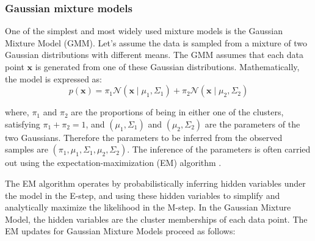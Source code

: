 \subsubsection{Gaussian mixture models}

One of the simplest and most widely used mixture models is the Gaussian Mixture Model (GMM). Let's assume the data is sampled from a mixture of two Gaussian distributions with different means. The GMM assumes that each data point $\mathbf{x}$ is generated from one of these Gaussian distributions. Mathematically, the model is expressed as:
\begin{equation}
p(\mathbf{x}) = \pi_1 \mathcal{N}(\mathbf{x} \mid \mu_1, \Sigma_1) + \pi_2 \mathcal{N}(\mathbf{x} \mid \mu_2, \Sigma_2)
\end{equation}

where, $\pi_1$ and $\pi_2$ are the proportions of being in either one of the clusters, satisfying $\pi_1 + \pi_2 = 1$, and $(\mu_1, \Sigma_1)$ and $(\mu_2, \Sigma_2)$ are the parameters of the two Gaussians. Therefore the parameters to be inferred from the observed samples are $(\pi_1, \mu_1, \Sigma_1, \mu_2, \Sigma_2)$. The inference of the parameters is often carried out using the expectation-maximization (EM) algorithm \cite{dempster1977maximum}.

The EM algorithm operates by probabilistically inferring hidden variables under the model in the E-step, and using these hidden variables to simplify and analytically maximize the likelihood in the M-step. In the Gaussian Mixture Model, the hidden variables are the cluster memberships of each data point. The EM updates for Gaussian Mixture Models proceed as follows:

